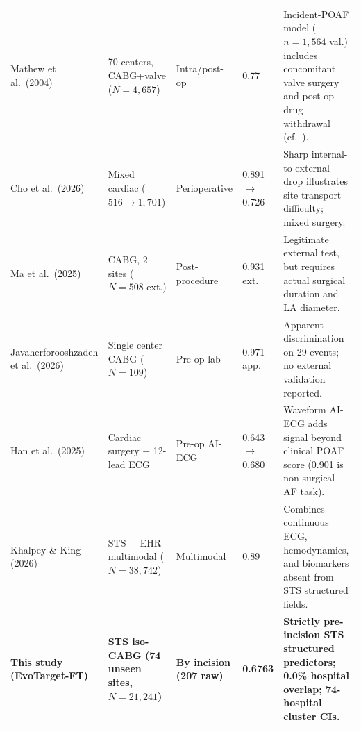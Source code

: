 \begin{table}[t]
\begin{tabularx}{\textwidth}{@{}L{3.25cm}L{2.45cm}L{1.8cm}R{1.45cm}Y@{}}
Mathew et al.\ (2004)~\cite{mathew2004multicenter} & 70 centers, CABG+valve ($N=4{,}657$) & Intra/post-op & 0.77 & Incident-POAF model ($n=1{,}564$ val.) includes concomitant valve surgery and post-op drug withdrawal (cf.~\cite{waldron2018poaf}). \\
Cho et al.\ (2026)~\cite{cho2026poaf} & Mixed cardiac ($516 \to 1{,}701$) & Perioperative & 0.891 $\to$ 0.726 & Sharp internal-to-external drop illustrates site transport difficulty; mixed surgery. \\
Ma et al.\ (2025)~\cite{ma2025noaf} & CABG, 2 sites ($N=508$ ext.) & Post-procedure & 0.931 ext. & Legitimate external test, but requires actual surgical duration and LA diameter. \\
Javaherforooshzadeh et al.\ (2026)~\cite{javaherforooshzadeh2026car} & Single center CABG ($N=109$) & Pre-op lab & 0.971 app. & Apparent discrimination on 29 events; no external validation reported. \\
Han et al.\ (2025)~\cite{han2025aiecg} & Cardiac surgery + 12-lead ECG & Pre-op AI-ECG & 0.643 $\to$ 0.680 & Waveform AI-ECG adds signal beyond clinical POAF score (0.901 is non-surgical AF task). \\
Khalpey \& King (2026)~\cite{khalpey2026digital} & STS + EHR multimodal ($N=38{,}742$) & Multimodal & 0.89 & Combines continuous ECG, hemodynamics, and biomarkers absent from STS structured fields. \\
\midrule
\textbf{\color{accent}This study (EvoTarget-FT)} & \textbf{STS iso-CABG (74 unseen sites, $N=21{,}241$)} & \textbf{By incision (207 raw)} & \textbf{\color{accent}0.6763} & \textbf{Strictly pre-incision STS structured predictors; 0.0\% hospital overlap; 74-hospital cluster CIs.} \\
\bottomrule
\end{tabularx}
\end{table}
